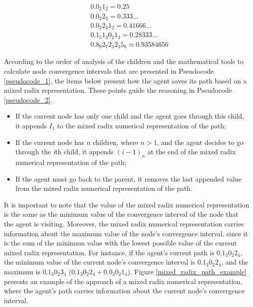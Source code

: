\begin{equation}
\begin{flalign}
& 0.0_{2}1_{2} = 0.25\\
& 0.0_{2}2_{3} = 0.333...\\ %
& 0.0_{2}2_{3}1_{2} = 0.41666...\\ %
& 0.1_{5}1_{3}0_{2}1_{2} = 0.28333...\\ %
& 0.8_{9}2_{7}2_{3}2_{3}5_{8} \approx 0.93584656 %
\end{flalign}
\label{equation_mixed_radix_value_examples}
\end{equation}

According to the order of analysis of the children and the mathematical tools to calculate node convergence intervals that are presented in Pseudocode \ref{pseudocode_1}, the items below present how the agent saves its path based on a mixed radix representation. These points guide the reasoning in Pseudocode \ref{pseudocode_2}.

\begin{itemize}
\item If the current node has only one child and the agent goes through this child, it appends $I_{1}$ to the mixed radix numerical representation of the path;

\item If the current node has $n$ children, where $n > 1$, and the agent decides to go through the \textit{i}th child, it appends $(i-1)_{n}$ at the end of the mixed radix numerical representation of the path;

\item If the agent must go back to the parent, it removes the last appended value from the mixed radix numerical representation of the path.
\end{itemize}

It is important to note that the value of the mixed radix numerical representation is the same as the minimum value of the convergence interval of the node that the agent is visiting. Moreover, the mixed radix numerical representation carries information about the maximum value of the node's convergence interval, since it is the sum of the minimum value with the lowest possible value of the current mixed radix representation. For instance, if the agent's current path is $0.1_{3}0_{2}2_{4}$, the minimum value of the current node's convergence interval is $0.1_{3}0_{2}2_{4}$, and the maximum is $0.1_{3}0_{2}3_{4}$ ($0.1_{3}0_{2}2_{4} + 0.0_{3}0_{2}1_{4}$). Figure \ref{mixed_radix_path_example} presents an example of the approach of a mixed radix numerical representation, where the agent's path carries information about the current node's convergence interval.

